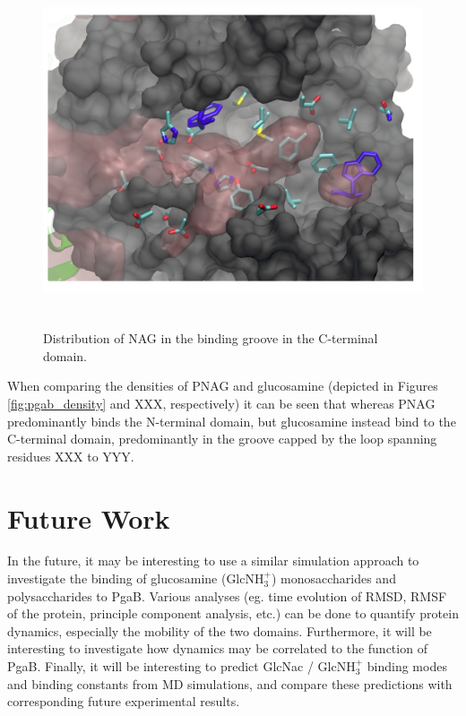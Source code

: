 \begin{figure}
\centering
\includegraphics[height=4.1in, width=6.23in]{figures/results4/nag_cterminal_zoomedin.png}
\caption{Distribution of NAG in the binding groove in the C-terminal domain.}
\label{fig:nag_cterminal_zoomedin}
\end{figure}

When comparing the densities of PNAG and glucosamine (depicted in Figures \ref{fig:pgab_density} and XXX, respectively) it can be seen that whereas PNAG predominantly binds the N-terminal domain, but glucosamine instead bind to the C-terminal domain, predominantly in the groove capped by the loop spanning residues XXX to YYY.  %

\section{Future Work}
In the future, it may be interesting to use a similar simulation approach to investigate the binding of glucosamine (GlcNH$_3^+$) monosaccharides and polysaccharides to PgaB.  Various analyses (eg. time evolution of RMSD, RMSF of the protein, principle component analysis, etc.) can be done to quantify protein dynamics, especially the mobility of the two domains. Furthermore, it will be interesting to investigate how dynamics may be correlated to the function of PgaB.  Finally, it will be interesting to predict GlcNac / GlcNH$_3^+$ binding modes and binding constants from MD simulations, and compare these predictions with corresponding future experimental results.

